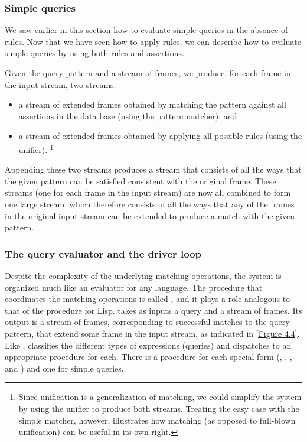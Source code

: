 \subsubsection*{Simple queries}

We saw earlier in this section how to evaluate simple queries in the absence of rules.
Now that we have seen how to apply rules, we can describe how to evaluate simple queries by using both rules and assertions.

Given the query pattern and a stream of frames, we produce, for each frame in the input stream, two streams:
\begin{itemize}

	\item
		a stream of extended frames obtained by matching the pattern against all assertions in the data base (using the pattern matcher), and

	\item
		a stream of extended frames obtained by applying all possible rules (using the unifier).%
		\footnote{
			Since unification is a generalization of matching, we could simplify the system by using the unifier to produce both streams.
			Treating the easy case with the simple matcher, however, illustrates how matching (as opposed to full-blown unification) can be useful in its own right.
		}

\end{itemize}
Appending these two streams produces a stream that consists of all the ways that the given pattern can be satisfied consistent with the original frame.
These streams (one for each frame in the input stream) are now all combined to form one large stream, which therefore consists of all the ways that any of the frames in the original input stream can be extended to produce a match with the given pattern.



\subsubsection*{The query evaluator and the driver loop}

Despite the complexity of the underlying matching operations, the system is organized much like an evaluator for any language.
The procedure that coordinates the matching operations is called , and it plays a role analogous to that of the  procedure for Lisp.
 takes as inputs a query and a stream of frames.
Its output is a stream of frames, corresponding to successful matches to the query pattern, that extend some frame in the input stream, as indicated in \cref{Figure 4.4}.
Like ,  classifies the different types of expressions (queries) and dispatches to an appropriate procedure for each.
There is a procedure for each special form (, , , and ) and one for simple queries.

